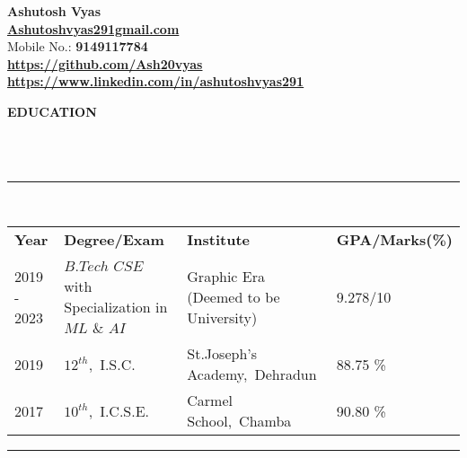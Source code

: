 \documentclass[a4paper,10pt]{article}
\newcommand{\lsep}{-0.5cm}
\newcommand{\resheading}[1]{{\small \colorbox{mygrey}{\begin{minipage}{0.98\textwidth}{\textbf{#1 \vphantom{p\^{E}}}}\end{minipage}}}}
\begin{document}
\textbf{Ashutosh Vyas} \\
\indent \textbf{\url{Ashutoshvyas291gmail.com}} \\
\indent Mobile No.: \textbf{9149117784} \ \\
\indent \textbf{\url{https://github.com/Ash20vyas}}\\
\indent \textbf{\url{https://www.linkedin.com/in/ashutoshvyas291}}\\

\resheading{\textbf{EDUCATION} }\\[\lsep]
\\
\indent \rule{7.34in}{0.4pt}\\
\indent \begin{tabular}{ l @{\hskip 0.17in} l @{\hskip 0.17in} l @{\hskip 0.17in} l @{\hskip 0.17in} }
\noindent \textbf{Year} & \textbf{Degree/Exam} & \textbf{Institute} & \textbf{GPA/Marks(\%)}\\
2019 - 2023 & $B.Tech$ $CSE$ with Specialization in $ML$ $\&$ $AI$ & Graphic Era (Deemed to be University) & 9.278/10 \\
2019 & $12^{th}$,\ I.S.C. & St.Joseph's Academy,\ Dehradun & 88.75 \% \\
2017 & $10^{th}$,\ I.C.S.E. & Carmel School,\ Chamba & 90.80 \%\\

\end{tabular}
\indent \rule{7.34in}{0.4pt}
\end{document}
